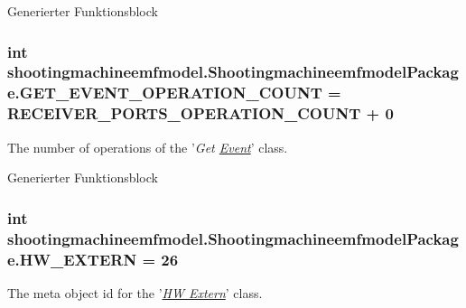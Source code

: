 Generierter Funktionsblock  \hypertarget{interfaceshootingmachineemfmodel_1_1_shootingmachineemfmodel_package_a9000680fce702b54d9bf48bd64789be7}{
\subsubsection[{G\-E\-T\-\_\-\-E\-V\-E\-N\-T\-\_\-\-O\-P\-E\-R\-A\-T\-I\-O\-N\-\_\-\-C\-O\-U\-N\-T}]{\setlength{\rightskip}{0pt plus 5cm}int shootingmachineemfmodel.\-Shootingmachineemfmodel\-Package.\-G\-E\-T\-\_\-\-E\-V\-E\-N\-T\-\_\-\-O\-P\-E\-R\-A\-T\-I\-O\-N\-\_\-\-C\-O\-U\-N\-T = {\bf R\-E\-C\-E\-I\-V\-E\-R\-\_\-\-P\-O\-R\-T\-S\-\_\-\-O\-P\-E\-R\-A\-T\-I\-O\-N\-\_\-\-C\-O\-U\-N\-T} + 0}}\label{interfaceshootingmachineemfmodel_1_1_shootingmachineemfmodel_package_a9000680fce702b54d9bf48bd64789be7}
The number of operations of the '{\itshape Get \hyperlink{interfaceshootingmachineemfmodel_1_1_event}{Event}}' class.

Generierter Funktionsblock  \hypertarget{interfaceshootingmachineemfmodel_1_1_shootingmachineemfmodel_package_a58063da7516b27741575dfd0ca3badff}{
\subsubsection[{H\-W\-\_\-\-E\-X\-T\-E\-R\-N}]{\setlength{\rightskip}{0pt plus 5cm}int shootingmachineemfmodel.\-Shootingmachineemfmodel\-Package.\-H\-W\-\_\-\-E\-X\-T\-E\-R\-N = 26}}\label{interfaceshootingmachineemfmodel_1_1_shootingmachineemfmodel_package_a58063da7516b27741575dfd0ca3badff}
The meta object id for the '\hyperlink{classshootingmachineemfmodel_1_1impl_1_1_h_w_extern_impl}{{\itshape H\-W Extern}}' class.

